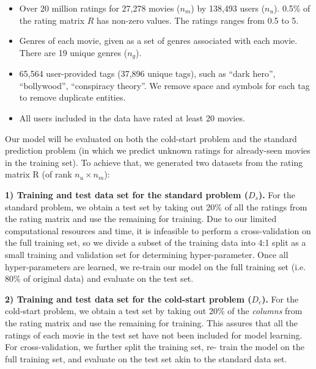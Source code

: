 \documentclass{article} %
\begin{document}
\begin{itemize}[leftmargin=15pt]
	\item Over 20 million ratings for 27,278 movies ($n_m$) by 138,493 users ($n_u$).
	0.5\% of the rating matrix $R$ has non-zero values.  The ratings ranges from 0.5 to 5.

	\item Genres of each movie, given as a set of genres associated with each
movie. There are 19 unique genres ($n_g$).

	\item 65,564 user-provided tags (37,896 unique tags), such as ``dark hero'', ``bollywood'',
	``conspiracy theory''.  We remove space and symbols for each tag to remove duplicate entities.

	\item All users included in the data have rated at least 20 movies.
\end{itemize}

Our model will be evaluated on both the cold-start problem and the standard
prediction problem (in which we predict unknown ratings for already-seen
movies in the training set). To achieve that, we generated two datasets from the
rating matrix R (of rank $n_u \times n_m$):

\textbf{1) Training and test data set for the standard problem ($D_s$).}
For the standard problem, we obtain a test set by taking out 20\% of all the
ratings from the rating matrix and use the remaining for training.
Due to our limited computational resources and time, it is infeasible to
perform a cross-validation on the full training set, so we divide a subset
of the training data into 4:1 split as a small training and validation set
for determining hyper-parameter.  Once all hyper-parameters are learned, we
re-train our model on the full training set (i.e. 80\% of original data) and
evaluate on the test set.

\textbf{2) Training and test data set for the cold-start problem ($D_c$).}
For the cold-start problem, we obtain a test set by taking out 20\% of   the
{\em columns} from the rating matrix and use the remaining for training. This
assures that all the ratings of each movie in the test set have not been
included for model learning.   For cross-validation, we further split the
training set, re- train the model on the full training set, and evaluate on
the test set akin to the standard data set.
\end{document}
